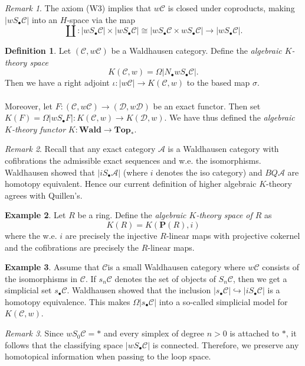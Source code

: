 \documentclass[10pt,letterpaper,cm]{nupset}
\theoremstyle{definition}
\newtheorem{definition}{Definition}
\newtheorem{exmp}[definition]{Example}
\theoremstyle{theorem}
\theoremstyle{remark}
\newtheorem{remark}{Remark}
\renewcommand{\P}{\mathbf P}
\newcommand{\1}{\mathbf{1}}
\renewcommand{\a}{\mathscr{A}}
\renewcommand{\c}{\mathscr{C}}
\renewcommand{\d}{\mathscr{D}}
\newcommand{\0}{\vec 0}
\begin{document}
\begin{remark}
The axiom (W3) implies that $w\c$ is closed under coproducts, making $|wS_{\bullet} \c|$ into an $H$-space via the map $$\coprod: |wS_{\bullet} \c| \times |wS_{\bullet} \c| \cong |wS_{\bullet} \c \times  wS_{\bullet} \c|\to |wS_{\bullet} \c|.$$
\end{remark}

\begin{definition}
Let $(\c, w\c)$ be a Waldhausen category. Define the \textit{algebraic $K$-theory space} $$K(\c, w) = \Omega | N_{\bullet} wS_{\bullet} \c|.$$ Then we have a right adjoint $\iota: |w \c | \to K(\c, w)$ to the based map $\sigma$.
\\ \\ Moreover,
let $F : (\c, w \c) \to (\d, w\d)$ be an exact functor. Then set $K(F) = \Omega | wS_{\bullet}F| : K(\c, w) \to K(\d, w)$. We have thus defined the \textit{algebraic $K$-theory functor} $K : \mathbf{Wald} \to \mathbf{Top_{\ast}}.$
\end{definition}

\begin{remark}
Recall that any exact category $\a$ is a Waldhausen category with cofibrations the admissible exact sequences and w.e. the isomorphisms. Waldhausen showed that $|iS_{\bullet}\a|$ (where $i$ denotes the iso category) and $BQ\a$ are homotopy equivalent. Hence our current definition of higher algebraic $K$-theory agrees with Quillen's.
\end{remark}

\begin{exmp}
Let $R$ be a ring. Define the \textit{algebraic $K$-theory space of $R$} as $$K(R) = K(\P(R), i)$$ where the w.e. $i$ are precisely the injective $R$-linear maps with projective cokernel and the cofibrations are precisely the $R$-linear maps.
\end{exmp}

\begin{exmp}
Assume that $\c$is a small Waldhausen category where $w\c$ consists of the isomorphisms in $\c$. If $s_n\c$ denotes the set of objects of $S_n \c$, then we get a simplicial set $s_{\bullet} \c$. Waldhausen showed that the inclusion $|s_{\bullet} \c| \hookrightarrow |iS_{\bullet} \c|$ is a homotopy equivalence. This makes $\Omega |s_{\bullet} \c|$ into a so-called simplicial model for $K(\c, w)$.
\end{exmp}

\begin{remark}
Since $wS_0 \c = \ast$ and every simplex of degree $n >0$ is attached to $\ast$, it follows that the classifying space $|w S_{\bullet} \c|$ is connected. Therefore, we preserve any homotopical information when passing to the loop space.
\end{remark}
\end{document}
